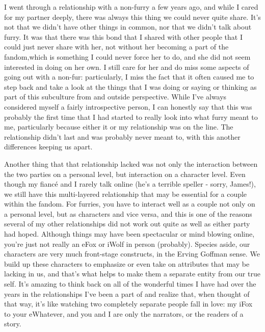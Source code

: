 I went through a relationship with a non-furry a few years ago, and while I cared for my partner deeply, there was always this thing we could never quite share. It's not that we didn't have other things in common, nor that we didn't talk about furry. It was that there was this bond that I shared with other people that I could just never share with her, not without her becoming a part of the fandom,which is something I could never force her to do, and she did not seem interested in doing on her own. I still care for her and do miss some aspects of going out with a non-fur: particularly, I miss the fact that it often caused me to step back and take a look at the things that I was doing or saying or thinking as part of this subculture from and outside perspective. While I've always considered myself a fairly introspective person, I can honestly say that this was probably the first time that I had started to really look into what furry meant to me, particularly because either it or my relationship was on the line. The relationship didn't last and was probably never meant to, with this another differences keeping us apart.

Another thing that that relationship lacked was not only the interaction between the two parties on a personal level, but interaction on a character level. Even though my fiancé and I rarely talk online (he's a terrible speller - sorry, James!), we still have this multi-layered relationship that may be essential for a couple within the fandom. For furries, you have to interact well as a couple not only on a personal level, but as characters and vice versa, and this is one of the reasons several of my other relationships did not work out quite as well as either party had hoped. Although things may have been spectacular or mind blowing online, you're just not really an eFox or iWolf in person (probably). Species aside, our characters are very much front-stage constructs, in the Erving Goffman sense. We build up these characters to emphasize or even take on attributes that may be lacking in us, and that's what helps to make them a separate entity from our true self. It's amazing to think back on all of the wonderful times I have had over the years in the relationships I've been a part of and realize that, when thought of that way, it's like watching two completely separate people fall in love: my iFox to your eWhatever, and you and I are only the narrators, or the readers of a story.

